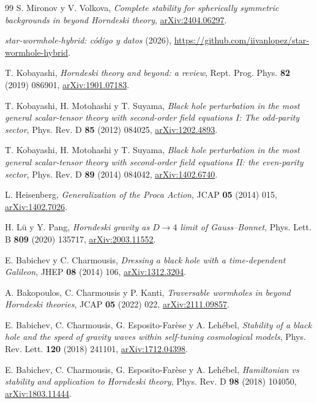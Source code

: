 \documentclass[11pt,a4paper]{article}
\theoremstyle{remark}
\begin{document}
\begin{thebibliography}{99}
 S. Mironov y V. Volkova, \emph{Complete stability for spherically symmetric backgrounds in beyond Horndeski theory}, \href{https://arxiv.org/abs/2404.06297}{arXiv:2404.06297}.

 \emph{star-wormhole-hybrid: código y datos} (2026), \url{https://github.com/iivanlopez/star-wormhole-hybrid}.

 T. Kobayashi, \emph{Horndeski theory and beyond: a review}, Rept. Prog. Phys. \textbf{82} (2019) 086901, \href{https://arxiv.org/abs/1901.07183}{arXiv:1901.07183}.

 T. Kobayashi, H. Motohashi y T. Suyama, \emph{Black hole perturbation in the most general scalar-tensor theory with second-order field equations I: The odd-parity sector}, Phys. Rev. D \textbf{85} (2012) 084025, \href{https://arxiv.org/abs/1202.4893}{arXiv:1202.4893}.

 T. Kobayashi, H. Motohashi y T. Suyama, \emph{Black hole perturbation in the most general scalar-tensor theory with second-order field equations II: the even-parity sector}, Phys. Rev. D \textbf{89} (2014) 084042, \href{https://arxiv.org/abs/1402.6740}{arXiv:1402.6740}.

 L. Heisenberg, \emph{Generalization of the Proca Action}, JCAP \textbf{05} (2014) 015, \href{https://arxiv.org/abs/1402.7026}{arXiv:1402.7026}.

 H. Lü y Y. Pang, \emph{Horndeski gravity as $D\to4$ limit of Gauss--Bonnet}, Phys. Lett. B \textbf{809} (2020) 135717, \href{https://arxiv.org/abs/2003.11552}{arXiv:2003.11552}.

 E. Babichev y C. Charmousis, \emph{Dressing a black hole with a time-dependent Galileon}, JHEP \textbf{08} (2014) 106, \href{https://arxiv.org/abs/1312.3204}{arXiv:1312.3204}.

 A. Bakopoulos, C. Charmousis y P. Kanti, \emph{Traversable wormholes in beyond Horndeski theories}, JCAP \textbf{05} (2022) 022, \href{https://arxiv.org/abs/2111.09857}{arXiv:2111.09857}.

 E. Babichev, C. Charmousis, G. Esposito-Farèse y A. Lehébel, \emph{Stability of a black hole and the speed of gravity waves within self-tuning cosmological models}, Phys. Rev. Lett. \textbf{120} (2018) 241101, \href{https://arxiv.org/abs/1712.04398}{arXiv:1712.04398}.

 E. Babichev, C. Charmousis, G. Esposito-Farèse y A. Lehébel, \emph{Hamiltonian vs stability and application to Horndeski theory}, Phys. Rev. D \textbf{98} (2018) 104050, \href{https://arxiv.org/abs/1803.11444}{arXiv:1803.11444}.


\end{thebibliography}
\end{document}

